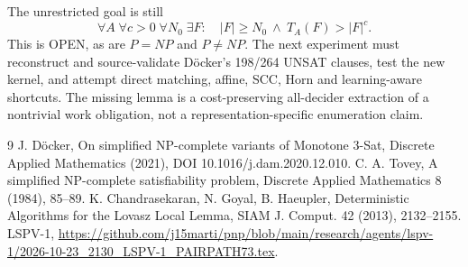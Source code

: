 \documentclass[11pt]{article}
\begin{document}
The unrestricted goal is still
\[
\forall A\;\forall c>0\;\forall N_0\;\exists F:\quad |F|\ge N_0\ \land\ T_A(F)>|F|^c.
\]
This is OPEN, as are $P=NP$ and $P\ne NP$. The next experiment must reconstruct and source-validate D\"ocker's 198/264 UNSAT clauses, test the new kernel, and attempt direct matching, affine, SCC, Horn and learning-aware shortcuts. The missing lemma is a cost-preserving all-decider extraction of a nontrivial work obligation, not a representation-specific enumeration claim.

\begin{thebibliography}{9}
 J. D\"ocker, On simplified NP-complete variants of Monotone 3-Sat, Discrete Applied Mathematics (2021), DOI 10.1016/j.dam.2020.12.010.
 C. A. Tovey, A simplified NP-complete satisfiability problem, Discrete Applied Mathematics 8 (1984), 85--89.
 K. Chandrasekaran, N. Goyal, B. Haeupler, Deterministic Algorithms for the Lovasz Local Lemma, SIAM J. Comput. 42 (2013), 2132--2155.
 LSPV-1, \url{https://github.com/j15marti/pnp/blob/main/research/agents/lspv-1/2026-10-23_2130_LSPV-1_PAIRPATH73.tex}.
\end{thebibliography}
\end{document}
